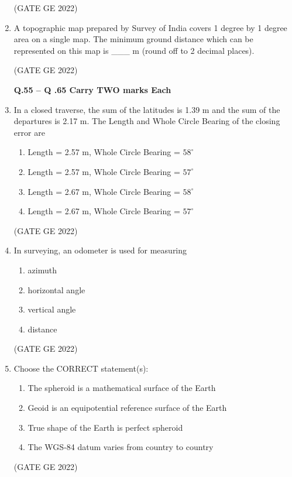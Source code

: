 \documentclass[a4paper, 11pt]{article}
\begin{document}
\begin{enumerate}
\hfill (GATE GE 2022)

\item A topographic map prepared by Survey of India covers 1 degree by 1 degree area on a single map. The minimum ground distance which can be represented on this map is \_\_\_ m (round off to 2 decimal places).

\hfill (GATE GE 2022)

\textbf{Q.55 – Q .65 Carry TWO marks Each}

\item In a closed traverse, the sum of the latitudes is 1.39 m and the sum of the departures is 2.17 m. The Length and Whole Circle Bearing of the closing error are
\begin{enumerate}
    \item Length = 2.57 m, Whole Circle Bearing = $58^\circ$
    \item Length = 2.57 m, Whole Circle Bearing = $57^\circ$
    \item Length = 2.67 m, Whole Circle Bearing = $58^\circ$
    \item Length = 2.67 m, Whole Circle Bearing = $57^\circ$
\end{enumerate}

\hfill (GATE GE 2022)

\item In surveying, an odometer is used for measuring
\begin{enumerate}
    \item azimuth
    \item horizontal angle
    \item vertical angle
    \item distance
\end{enumerate}

\hfill (GATE GE 2022)

\item Choose the CORRECT statement(s):
\begin{enumerate}
    \item The spheroid is a mathematical surface of the Earth
    \item Geoid is an equipotential reference surface of the Earth
    \item True shape of the Earth is perfect spheroid
    \item The WGS-84 datum varies from country to country
\end{enumerate}

\hfill (GATE GE 2022)


\end{enumerate}
\end{document}
